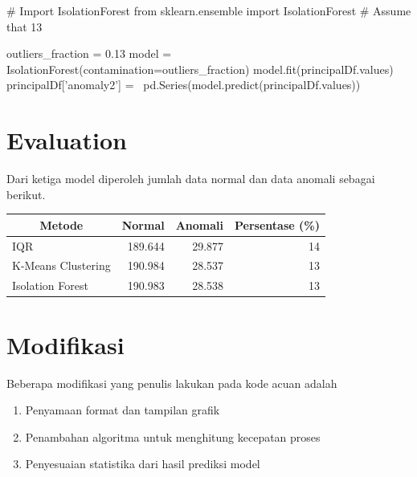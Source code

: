 \begin{python}
# Import IsolationForest
from sklearn.ensemble import IsolationForest
# Assume that 13%
    
outliers_fraction = 0.13
model =  IsolationForest(contamination=outliers_fraction)
model.fit(principalDf.values) 
principalDf['anomaly2'] = \
    pd.Series(model.predict(principalDf.values))
\end{python}

    \section{Evaluation}

    Dari ketiga model diperoleh jumlah data normal dan data anomali sebagai berikut.

    \begin{table}[h]
        \centering
        \begin{tabular}{|l|r|r|r|}
            \hline
            \multicolumn{1}{|c|}{\textbf{Metode}} & \multicolumn{1}{c|}{\textbf{Normal}} & \multicolumn{1}{c|}{\textbf{Anomali}} & \multicolumn{1}{c|}{\textbf{Persentase (\%)}} \\ \hline
            IQR                & 189.644 & 29.877 & 14 \\ \hline
            K-Means Clustering & 190.984 & 28.537 & 13 \\ \hline
            Isolation Forest   & 190.983 & 28.538 & 13 \\ \hline
        \end{tabular}
    \end{table}

\section{Modifikasi}
Beberapa modifikasi yang penulis lakukan pada kode acuan adalah
\begin{enumerate}
    \item Penyamaan format dan tampilan grafik
    \item Penambahan algoritma untuk menghitung kecepatan proses
    \item Penyesuaian statistika dari hasil prediksi model
\end{enumerate}
